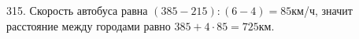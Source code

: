 315. Скорость автобуса равна $(385-215):(6-4)=85$км/ч, значит расстояние между городами равно $385+4\cdot85=725$км.\\
